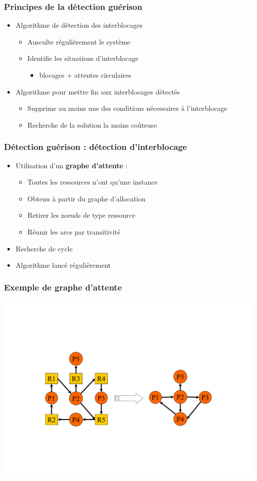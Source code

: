 \begin{frame}
\frametitle{Principes de la \textbf{détection guérison}}
\begin{itemize}
\item <1-> [détection] Algorithme de détection des interblocages
\begin{itemize}
\item Ausculte régulièrement le système
\item Identifie les situations d’interblocage
\begin{itemize}
\item blocages + attentes circulaires
\end{itemize}
\end{itemize}
\item <2-> [guérison] Algorithme pour mettre fin aux interblocages détectés
\begin{itemize}
\item Supprime au moins une des conditions nécessaires à l’interblocage
\item Recherche de la solution la moins coûteuse
\end{itemize}
\end{itemize}
\end{frame}

\begin{frame}
\frametitle{Détection guérison : détection d’interblocage}
\begin{itemize}
\item Utilisation d’un \textbf{graphe d’attente} :
\begin{itemize}
\item Toutes les ressources n’ont qu’une instance
\item Obtenu à partir du graphe d’allocation
\item Retirer les nœuds de type ressource
\item Réunir les arcs par transitivité
\end{itemize}
\item Recherche de cycle
\item Algorithme lancé régulièrement
\end{itemize}
\end{frame}

\begin{frame}
\frametitle{Exemple de graphe d’attente}
\includegraphics[width=.9\textwidth]{../illustration/gar2ga.pdf}
\end{frame}

